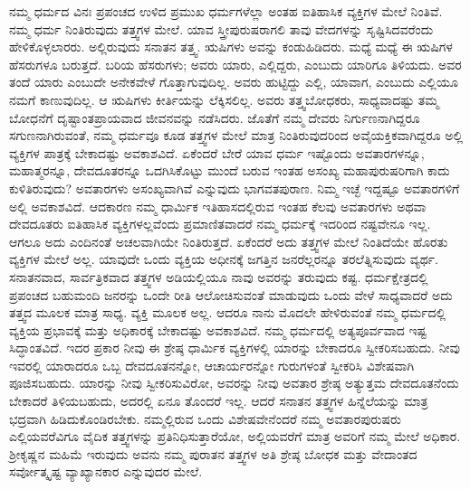 ನಮ್ಮ ಧರ್ಮದ ವಿನಃ ಪ್ರಪಂಚದ ಉಳಿದ ಪ್ರಮುಖ ಧರ್ಮಗಳೆಲ್ಲಾ ಅಂತಹ ಐತಿಹಾಸಿಕ ವ್ಯಕ್ತಿಗಳ ಮೇಲೆ ನಿಂತಿವೆ. ನಮ್ಮ ಧರ್ಮ ನಿಂತಿರುವುದು ತತ್ತ್ವಗಳ ಮೇಲೆ. ಯಾವ ಸ್ತ್ರೀಪುರುಷರಾಗಲಿ ತಾವು ವೇದಗಳನ್ನು ಸೃಷ್ಟಿಸಿದವರೆಂದು ಹೇಳಿಕೊಳ್ಳಲಾರರು. ಅಲ್ಲಿರುವುದು ಸನಾತನ ತತ್ತ್ವ. ಋಷಿಗಳು ಅವನ್ನು ಕಂಡುಹಿಡಿದರು. ಮಧ್ಯೆ ಮಧ್ಯೆ ಈ ಋಷಿಗಳ ಹೆಸರುಗಳೂ ಬರುತ್ತದೆ. ಬರಿಯ ಹೆಸರುಗಳು; ಅವರು ಯಾರು, ಎಲ್ಲಿದ್ದರು, ಎಂಬುದು ಯಾರಿಗೂ ತಿಳಿಯದು. ಅವರ ತಂದೆ ಯಾರು ಎಂಬುದೇ ಅನೇಕವೇಳೆ ಗೊತ್ತಾಗುವುದಿಲ್ಲ. ಅವರು ಹುಟ್ಟಿದ್ದು ಎಲ್ಲಿ, ಯಾವಾಗ, ಎಂಬುದು ಎಲ್ಲಿಯೂ ನಮಗೆ ಕಾಣುವುದಿಲ್ಲ. ಆ ಋಷಿಗಳು ಕೀರ್ತಿಯನ್ನು ಲೆಕ್ಕಿಸಲಿಲ್ಲ. ಅವರು ತತ್ತ್ವಬೋಧಕರು, ಸಾಧ್ಯವಾದಷ್ಟು ತಮ್ಮ ಬೋಧನೆಗೆ ದೃಷ್ಟಾಂತಪ್ರಾಯವಾದ ಜೀವನವನ್ನು ನಡೆಸಿದರು. ಜೊತೆಗೆ ನಮ್ಮ ದೇವರು ನಿರ್ಗುಣನಾಗಿದ್ದರೂ ಸಗುಣನಾಗಿರುವಂತೆ, ನಮ್ಮ ಧರ್ಮವೂ ಕೂಡ ತತ್ತ್ವಗಳ ಮೇಲೆ ಮಾತ್ರ ನಿಂತಿರುವುದರಿಂದ ಅವೈಯಕ್ತಿಕವಾಗಿದ್ದರೂ ಅಲ್ಲಿ ವ್ಯಕ್ತಿಗಳ ಪಾತ್ರಕ್ಕೆ ಬೇಕಾದಷ್ಟು ಅವಕಾಶವಿದೆ. ಏಕೆಂದರೆ ಬೇರೆ ಯಾವ ಧರ್ಮ ಇಷ್ಟೊಂದು ಅವತಾರಗಳನ್ನೂ, ಮಹಾತ್ಮರನ್ನೂ, ದೇವದೂತರನ್ನೂ ಒದಗಿಸಿಕೊಟ್ಟು ಮುಂದೆ ಬರುವ ಇಂತಹ ಅಸಂಖ್ಯ ಮಹಾಪುರುಷರಿಗಾಗಿ ಕಾದು ಕುಳಿತಿರುವುದು? ಅವತಾರಗಳು ಅಸಂಖ್ಯವಾಗಿವೆ ಎನ್ನುವುದು ಭಾಗವತಪುರಾಣ. ನಿಮ್ಮ ಇಚ್ಛೆ ಇದ್ದಷ್ಟೂ ಅವತಾರಗಳಿಗೆ ಅಲ್ಲಿ ಅವಕಾಶವಿದೆ. ಆದಕಾರಣ ನಮ್ಮ ಧಾರ್ಮಿಕ ಇತಿಹಾಸದಲ್ಲಿರುವ ಇಂತಹ ಕೆಲವು ಅವತಾರಗಳು ಅಥವಾ ದೇವದೂತರು ಐತಿಹಾಸಿಕ ವ್ಯಕ್ತಿಗಳಲ್ಲವೆಂದು ಪ್ರಮಾಣಿತವಾದರೆ ನಮ್ಮ ಧರ್ಮಕ್ಕೆ ಇದರಿಂದ ನಷ್ಟವೇನೂ ಇಲ್ಲ. ಆಗಲೂ ಅದು ಎಂದಿನಂತೆ ಅಚಲವಾಗಿಯೇ ನಿಂತಿರುತ್ತದೆ. ಏಕೆಂದರೆ ಅದು ತತ್ತ್ವಗಳ ಮೇಲೆ ನಿಂತಿದೆಯೇ ಹೊರತು ವ್ಯಕ್ತಿಗಳ ಮೇಲೆ ಅಲ್ಲ. ಯಾವುದೇ ಒಂದು ವ್ಯಕ್ತಿಯ ಅಧೀನಕ್ಕೆ ಜಗತ್ತಿನ ಜನರೆಲ್ಲರನ್ನೂ ತರಲೆತ್ನಿಸುವುದು ವ್ಯರ್ಥ. ಸನಾತನವಾದ, ಸಾರ್ವತ್ರಿಕವಾದ ತತ್ತ್ವಗಳ ಅಡಿಯಲ್ಲಿಯೂ ನಾವು ಅವರನ್ನು ತರುವುದು ಕಷ್ಟ. ಧರ್ಮಕ್ಷೇತ್ರದಲ್ಲಿ ಪ್ರಪಂಚದ ಬಹುಮಂದಿ ಜನರನ್ನು ಒಂದೇ ರೀತಿ ಆಲೋಚಿಸುವಂತೆ ಮಾಡುವುದು ಒಂದು ವೇಳೆ ಸಾಧ್ಯವಾದರೆ ಅದು ತತ್ತ್ವದ ಮೂಲಕ ಮಾತ್ರ ಸಾಧ್ಯ. ವ್ಯಕ್ತಿ ಮೂಲಕ ಅಲ್ಲ. ಆದರೂ ನಾನು ಮೊದಲೇ ಹೇಳಿರುವಂತೆ ನಮ್ಮ ಧರ್ಮದಲ್ಲಿ ವ್ಯಕ್ತಿಯ ಪ್ರಭಾವಕ್ಕೆ ಮತ್ತು ಅಧಿಕಾರಕ್ಕೆ ಬೇಕಾದಷ್ಟು ಅವಕಾಶವಿದೆ. ನಮ್ಮ ಧರ್ಮದಲ್ಲಿ ಅತ್ಯಪೂರ್ವವಾದ ಇಷ್ಟ ಸಿದ್ಧಾಂತವಿದೆ. ಇದರ ಪ್ರಕಾರ ನೀವು ಈ ಶ್ರೇಷ್ಠ ಧಾರ್ಮಿಕ ವ್ಯಕ್ತಿಗಳಲ್ಲಿ ಯಾರನ್ನು ಬೇಕಾದರೂ ಸ್ವೀಕರಿಸಬಹುದು. ನೀವು ಇವರಲ್ಲಿ ಯಾರಾದರೂ ಒಬ್ಬ ದೇವದೂತನನ್ನೋ, ಆಚಾರ್ಯರನ್ನೋ ಗುರುಗಳಂತೆ ಸ್ವೀಕರಿಸಿ ವಿಶೇಷವಾಗಿ ಪೂಜಿಸಬಹುದು. ಯಾರನ್ನು ನೀವು ಸ್ವೀಕರಿಸುವಿರೋ, ಅವರನ್ನು ನೀವು ಅವತಾರ ಶ್ರೇಷ್ಠ ಅತ್ಯುತ್ತಮ ದೇವದೂತನೆಂದು ಬೇಕಾದರೆ ತಿಳಿಯಬಹುದು, ಅದರಲ್ಲಿ ಏನೂ ತೊಂದರೆ ಇಲ್ಲ. ಆದರೆ ಸನಾತನ ತತ್ತ್ವಗಳ ಹಿನ್ನೆಲೆಯನ್ನು ಮಾತ್ರ ಭದ್ರವಾಗಿ ಹಿಡಿದುಕೊಂಡಿರಬೇಕು. ನಮ್ಮಲ್ಲಿರುವ ಒಂದು ವಿಶೇಷವೇನೆಂದರೆ ನಮ್ಮ ಅವತಾರಪುರುಷರು ಎಲ್ಲಿಯವರೆವಿಗೂ ವೈದಿಕ ತತ್ತ್ವಗಳನ್ನು ಪ್ರತಿನಿಧಿಸುತ್ತಾರೆಯೋ, ಅಲ್ಲಿಯವರೆಗೆ ಮಾತ್ರ ಅವರಿಗೆ ನಮ್ಮ ಮೇಲೆ ಅಧಿಕಾರ. ಶ‍್ರೀಕೃಷ್ಣನ ಮಹಿಮೆ ಇರುವುದು ಅವನು ನಮ್ಮ ಪುರಾತನ ತತ್ತ್ವಗಳ ಅತಿ ಶ್ರೇಷ್ಠ ಬೋಧಕ ಮತ್ತು ವೇದಾಂತದ ಸರ್ವೋತ್ಕೃಷ್ಟ ವ್ಯಾಖ್ಯಾನಕಾರ ಎನ್ನುವುದರ ಮೇಲೆ.

